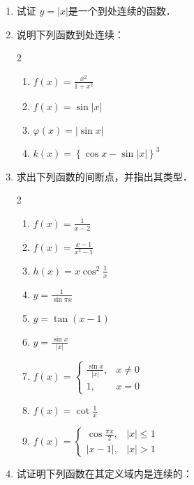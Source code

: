 \begin{ex}
\begin{enumerate}
    \item 试证 $y=|x|$是一个到处连续的函数．
    \item 说明下列函数到处连续：
\begin{multicols}{2}
\begin{enumerate}
    \item $f(x)=\frac{x^2}{1+x^2}$
    \item $f(x)=\sin|x|$
    \item $\varphi(x)=|\sin x|$
    \item $k(x)=\left\{\cos x-\sin|x|\right\}^3$
\end{enumerate}
\end{multicols}

\item 求出下列函数的间断点，并指出其类型．
\begin{multicols}{2}
\begin{enumerate}
    \item $f(x)=\frac{1}{x-2}$
    \item $f(x)=\frac{x-1}{x^2-1}$
    \item $h(x)=x\cos^2 \frac{1}{x}$
    \item $y=\frac{1}{\sin\pi x}$
    \item $y=\tan(x-1)$
    \item $y=\frac{\sin x}{|x|}$
    \item $f(x)=\begin{cases}
        \frac{\sin x}{|x|},&x\ne 0\\
        1,& x=0
    \end{cases}$
    \item $f(x)=\cot\frac{1}{x}$
    \item $f(x)=\begin{cases}
        \cos\frac{\pi x}{2},& |x|\le 1\\
        |x-1|,& |x|>1
    \end{cases}$
\end{enumerate}
\end{multicols}
\item 试证明下列函数在其定义域内是连续的：
\end{enumerate}
\end{ex}

